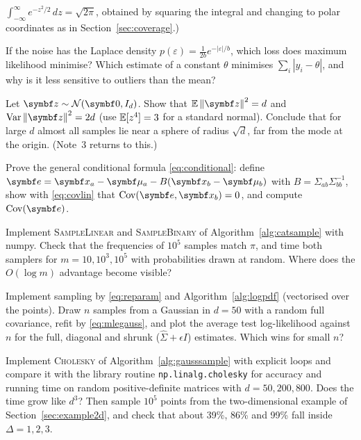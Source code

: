 \documentclass[11pt]{article}
\begin{document}
\begin{questions}
\begin{derivations}
$\int_{-\infty}^{\infty} e^{-z^2/2}\,dz = \sqrt{2\pi}$, obtained by squaring the integral and changing to polar
coordinates as in Section~\ref{sec:coverage}.)
\item If the noise has the Laplace density $p(\varepsilon) = \frac{1}{2b} e^{-|\varepsilon|/b}$, which loss does
maximum likelihood minimise? Which estimate of a constant $\theta$ minimises $\sum_i |y_i - \theta|$, and why is it
less sensitive to outliers than the mean?
\item Let $\vect{z} \sim \Normal(\vect{0}, I_d)$. Show that $\E\norm{\vect{z}}^2 = d$ and $\Var\norm{\vect{z}}^2 = 2d$
(use $\mathbb{E}[z^4] = 3$ for a standard normal). Conclude that for large $d$ almost all samples lie near a sphere of radius
$\sqrt d$, far from the mode at the origin. (Note~3 returns to this.)
\item Prove the general conditional formula \eqref{eq:conditional}: define $\vect{e} = \x_a - \vmu_a - B(\x_b - \vmu_b)$
with $B = \Sigma_{ab}\Sigma_{bb}^{-1}$, show with \eqref{eq:covlin} that $\Cov(\vect{e}, \x_b) = 0$, and compute
$\Cov(\vect{e})$.
\end{derivations}
\begin{programming}
\item Implement \textsc{SampleLinear} and \textsc{SampleBinary} of Algorithm~\ref{alg:catsample} with numpy. Check that
the frequencies of $10^5$ samples match $\pi$, and time both samplers for $m = 10, 10^3, 10^5$ with probabilities
drawn at random. Where does the $O(\log m)$ advantage become visible?
\item Implement sampling by \eqref{eq:reparam} and Algorithm~\ref{alg:logpdf} (vectorised over the points). Draw $n$ samples from a Gaussian in $d = 50$
with a random full covariance, refit by \eqref{eq:mlegauss}, and plot the average test log-likelihood against $n$ for
the full, diagonal and shrunk ($\hat\Sigma + \epsilon I$) estimates. Which wins for small $n$?
\item Implement \textsc{Cholesky} of Algorithm~\ref{alg:gausssample} with explicit loops and compare it with the
library routine \texttt{np.linalg.cholesky} for accuracy and running time on random positive-definite matrices with
$d = 50, 200, 800$. Does the time grow like $d^3$? Then sample $10^5$ points from the two-dimensional
example of Section~\ref{sec:example2d}, and check that about 39\%, 86\% and 99\% fall inside $\Delta = 1, 2, 3$.
\end{programming}
\end{questions}
\end{document}
